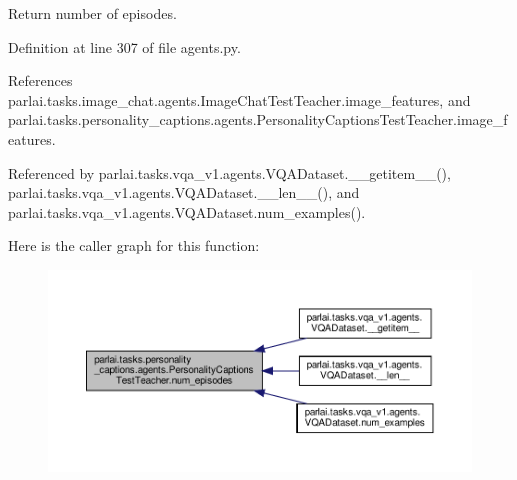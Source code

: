 \begin{DoxyVerb}Return number of episodes.\end{DoxyVerb}
 

Definition at line 307 of file agents.\+py.



References parlai.\+tasks.\+image\+\_\+chat.\+agents.\+Image\+Chat\+Test\+Teacher.\+image\+\_\+features, and parlai.\+tasks.\+personality\+\_\+captions.\+agents.\+Personality\+Captions\+Test\+Teacher.\+image\+\_\+features.



Referenced by parlai.\+tasks.\+vqa\+\_\+v1.\+agents.\+V\+Q\+A\+Dataset.\+\_\+\+\_\+getitem\+\_\+\+\_\+(), parlai.\+tasks.\+vqa\+\_\+v1.\+agents.\+V\+Q\+A\+Dataset.\+\_\+\+\_\+len\+\_\+\+\_\+(), and parlai.\+tasks.\+vqa\+\_\+v1.\+agents.\+V\+Q\+A\+Dataset.\+num\+\_\+examples().

Here is the caller graph for this function\+:
\nopagebreak
\begin{figure}[H]
\begin{center}
\leavevmode
\includegraphics[width=350pt]{classparlai_1_1tasks_1_1personality__captions_1_1agents_1_1PersonalityCaptionsTestTeacher_abd4a7d0a0310ae93861f1e3e70e02260_icgraph}
\end{center}
\end{figure}
\mbox{\label{classparlai_1_1tasks_1_1personality__captions_1_1agents_1_1PersonalityCaptionsTestTeacher_aa3c10b49dc8d2510f8d28846194ac2a6}} 
